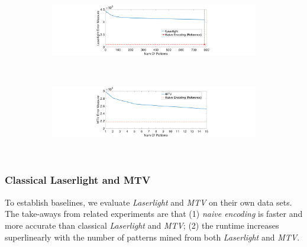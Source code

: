 \begin{figure}[ht!]
    \captionsetup[subfigure]{justification=centering}
    \centering
    \begin{subfigure}[b]{0.48\textwidth}
        \centering       
        \includegraphics[width=\textwidth]{QueryLogSummarization/graphics/Laserlight_Error_vs_NumOfPatterns.pdf}
        \label{fig:Laserlight_Error_vs_NumOfPatterns}
    \end{subfigure}
    ~
    \begin{subfigure}[b]{0.48\textwidth}
        \centering       
        \includegraphics[width=\textwidth]{QueryLogSummarization/graphics/MTV_Error_vs_NumOfPatterns.pdf}
        \label{fig:MTV_Error_vs_NumOfPatterns}
    \end{subfigure}
    ~
    \label{fig:performance_vs_num_of_patterns}
    \trimfigurewhitespace
\end{figure}

\subsubsection{Classical Laserlight and MTV}
\label{sec:classicallaserlightandmtv}

To establish baselines, we evaluate \textit{Laserlight} and \textit{MTV} on their own data sets.
The take-aways from related experiments are that (1) \textit{naive encoding} is faster and more accurate than classical \textit{Laserlight} and \textit{MTV}; (2) the runtime increases superlinearly with the number of patterns mined from both \textit{Laserlight} and \textit{MTV}.

